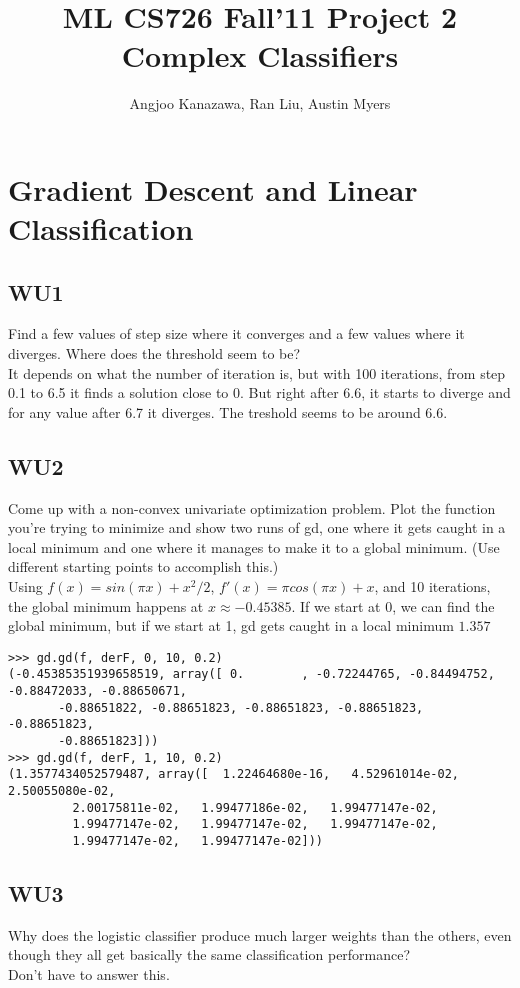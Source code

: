 \documentclass[a4paper,11pt]{article}
\begin{document}
\title{ML CS726 Fall'11 Project 2 Complex Classifiers}
\author{Angjoo Kanazawa, Ran Liu, Austin Myers}
\maketitle


\section{Gradient Descent and Linear Classification}
\subsection{WU1}
\textsf{Find a few values of step size where it converges and a few
  values where it diverges. Where does the threshold seem to be?}\\
It depends on what the number of iteration is, but with 100
iterations, from step 0.1 to 6.5 it finds a solution close to
0. But right after 6.6, it starts to diverge and for any value after
6.7 it diverges. The treshold seems to be around 6.6.

\subsection{WU2}
\textsf{Come up with a non-convex univariate optimization
  problem. Plot the function you're trying to minimize and show two
  runs of gd, one where it gets caught in a local minimum and one
  where it manages to make it to a global minimum. (Use different
  starting points to accomplish this.)}\\
Using $f(x) = sin(\pi x) + x^2/2$, $f'(x) = \pi cos(\pi x) + x$, and
10 iterations, the
global minimum happens at $x\approx -0.45385$.
If we start at 0, we can find the global minimum, but if we start at
1, gd gets caught in a local minimum $1.357$
\begin{verbatim}
>>> gd.gd(f, derF, 0, 10, 0.2)
(-0.45385351939658519, array([ 0.        , -0.72244765, -0.84494752, -0.88472033, -0.88650671,
       -0.88651822, -0.88651823, -0.88651823, -0.88651823, -0.88651823,
       -0.88651823]))
>>> gd.gd(f, derF, 1, 10, 0.2)
(1.3577434052579487, array([  1.22464680e-16,   4.52961014e-02,   2.50055080e-02,
         2.00175811e-02,   1.99477186e-02,   1.99477147e-02,
         1.99477147e-02,   1.99477147e-02,   1.99477147e-02,
         1.99477147e-02,   1.99477147e-02]))
\end{verbatim}

\subsection{WU3}
\textsf{Why does the logistic classifier produce much larger weights
  than the others, even though they all get basically the same
  classification performance?}\\ Don't have to answer this.
\end{document}
